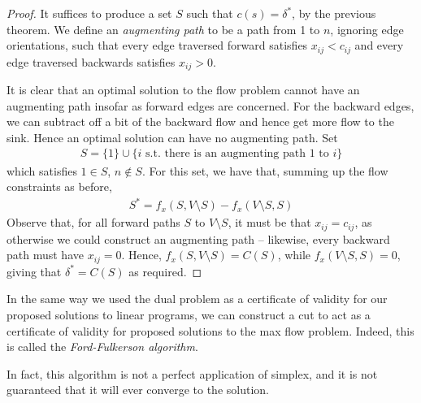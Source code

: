 \documentclass{../../template/note}
\begin{document}
    \begin{proof}
        It suffices to produce a set $S$ such that $c(s) = \delta^*$, by the previous theorem. We define an \emph{augmenting path} to be a path from 1 to $n$, ignoring edge orientations, such that every edge traversed forward satisfies $x_{ij} < c_{ij}$ and every edge traversed backwards satisfies $x_{ij} > 0$.

        It is clear that an optimal solution to the flow problem cannot have an augmenting path insofar as forward edges are concerned. For the backward edges, we can subtract off a bit of the backward flow and hence get more flow to the sink. Hence an optimal solution can have no augmenting path. Set
        \begin{align*}
            S = \{1\} \cup \{i \text{ s.t. there is an augmenting path 1 to } i\}
        \end{align*}
        which satisfies $1 \in S$, $n \notin S$. For this set, we have that, summing up the flow constraints as before,
        \begin{align*}
            S^* = f_x(S, V \setminus S) - f_x(V \setminus S, S)
        \end{align*}
        Observe that, for all forward paths $S$ to $V \setminus S$, it must be that $x_{ij} = c_{ij}$, as otherwise we could construct an augmenting path -- likewise, every backward path must have $x_{ij} = 0$. Hence, $f_x(S, V \setminus S) = C(S)$, while $f_x(V \setminus S, S) = 0$, giving that $\delta^* = C(S)$ as required.
    \end{proof}
    
    \begin{remark*}
        In the same way we used the dual problem as a certificate of validity for our proposed solutions to linear programs, we can construct a cut to act as a certificate of validity for proposed solutions to the max flow problem. Indeed, this is called the \emph{Ford-Fulkerson algorithm}.
    \end{remark*}
    
    In fact, this algorithm is not a perfect application of simplex, and it is not guaranteed that it will ever converge to the solution.
    
    
    
    
    
    
    
    
    
    
    
\end{document}
